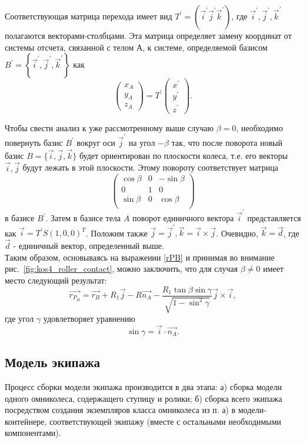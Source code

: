 \documentclass[12pt]{article}
\begin{document}
Соответствующая матрица перехода имеет вид $T^\prime = (\vec{i}^\prime\vec{j}^\prime\vec{k}^\prime)$, где $\vec{i}^\prime, \vec{j}^\prime, \vec{k}^\prime$ полагаются векторами-столбцами. Эта матрица определяет
 замену координат от системы отсчета, связанной с телом А, к системе, определяемой базисом $B^\prime = \left\{\vec{i}^\prime,\vec{j}^\prime,\vec{k}^\prime\right\}$ как
$$\left(\begin{array}{ccc}x_A\\y_A\\z_A\end{array}\right) = T^\prime\left(\begin{array}{ccc}x^\prime\\y^\prime\\z^\prime\end{array}\right).$$
 
Чтобы свести анализ к уже рассмотренному выше случаю $\beta = 0$, необходимо повернуть базис $B^\prime$ вокруг оси $\vec{j}^\prime$ на угол $-\beta$ так, что после поворота новый базис $B = \{\vec{i},\vec{j},\vec{k}\}$ будет ориентирован по плоскости колеса, т.е. его векторы $\vec{i}, \vec{j}$ будут лежать в этой плоскости. Этому повороту соответствует матрица 
$$\left(\begin{array}{ccc}
\cos\beta & 0 & -\sin\beta \\
0         & 1 & 0          \\
\sin\beta & 0 & \cos\beta  \\
\end{array}\right)$$
в базисе $B^\prime$. Затем в базисе тела $A$ поворот единичного вектора $\vec{i}^\prime$ представляется как $\vec{i} = T^\prime S(1,0,0)^T$. Положим также $\vec{j} = \vec{j}^\prime, \vec{k} = \vec{i}\times\vec{j}$. Очевидно, $\vec{k} = \vec{d}$, где $\vec{d}$ - единичный вектор, определенный выше.\\

Таким образом, основываясь на выражении \eqref{rPB} и принимая во внимание рис.~\ref{fig:kos4_roller_contact}, можно заключить, что для случая $\beta\neq 0$ имеет место следующий результат:
\begin{equation}
\vec{r_{P_B}} = \vec{r_B}+R_1\vec{j} - R\vec{n_A} - \frac{R_1\tan\beta\sin\gamma}{\sqrt{1-\sin^2\gamma}}\vec{j}\times\vec{i},
\end{equation}
где угол $\gamma$ удовлетворяет уравнению
$$\sin\gamma = \vec{i}\cdot\vec{n_A}.$$

\subsection{Модель экипажа}
Процесс сборки модели экипажа производится в два этапа: а) сборка модели одного омниколеса, содержащего ступицу и ролики; б) сборка всего экипажа посредством создания экземпляров класса омниколеса из п. а) в модели-контейнере, соответствующей экипажу (вместе с остальными необходимыми компонентами).\\
\end{document}
